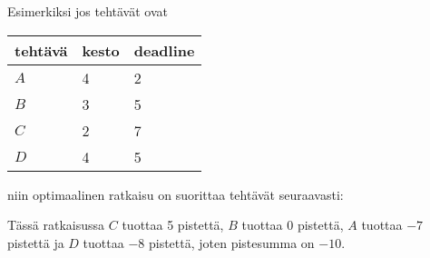 \begin{minipage}{\textwidth}
Esimerkiksi jos tehtävät ovat

\begin{center}
\begin{tabular}{lll}
tehtävä & kesto & deadline \\
\hline
$A$ & 4 & 2 \\
$B$ & 3 & 5 \\
$C$ & 2 & 7 \\
$D$ & 4 & 5 \\
\end{tabular}
\end{center}
\end{minipage}

\noindent
niin optimaalinen ratkaisu on suorittaa
tehtävät seuraavasti:

\begin{center}
\end{center}
Tässä ratkaisussa $C$ tuottaa 5 pistettä,
$B$ tuottaa 0 pistettä, $A$ tuottaa $-7$ pistettä
ja $D$ tuottaa $-8$ pistettä,
joten pistesumma on $-10$.

